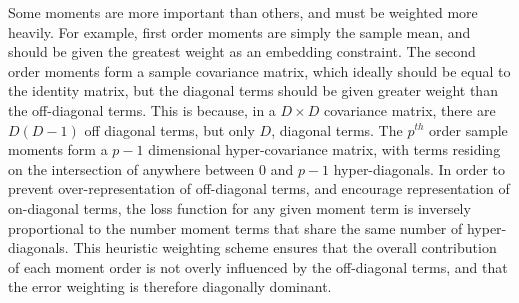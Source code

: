 \documentclass[10pt,twocolumn,letterpaper]{article}
\begin{document}
Some moments are more important than others, and must be weighted more heavily.  
For example, first order moments are simply the sample mean, and should be given the greatest weight as an embedding constraint.  
The second order moments form a sample covariance matrix, which ideally should be equal to the identity matrix, but the diagonal terms should be given greater weight than the off-diagonal terms.  
This is because, in a $D \times D$ covariance matrix, there are $D(D-1)$ off diagonal terms, but only $D$, diagonal terms.  
The $p^{th}$ order sample moments form a $p-1$ dimensional hyper-covariance matrix, with terms residing on the intersection of anywhere between $0$ and $p-1$ hyper-diagonals.  
In order to prevent over-representation of off-diagonal terms, and encourage representation of on-diagonal terms, the loss function for any given moment term is inversely proportional to the number moment terms that share the same number of hyper-diagonals.  
This heuristic weighting scheme ensures that the overall contribution of each moment order is not overly influenced by the off-diagonal terms, and that the error weighting is therefore diagonally dominant.

%
\end{document}
